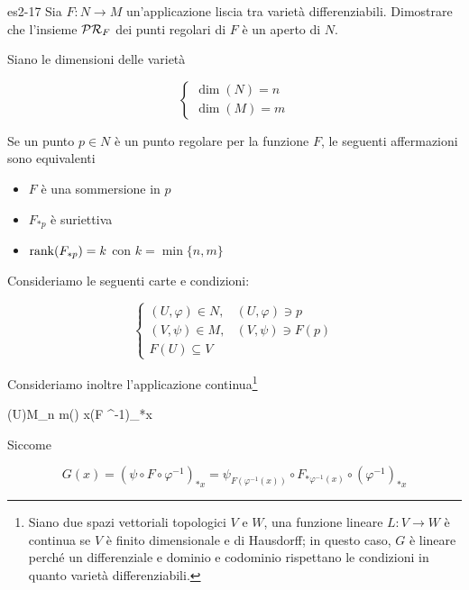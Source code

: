 {es2-17}
{
Sia $ F : N \to M $ un'applicazione liscia tra varietà differenziabili. Dimostrare che l'insieme $ \mathcal{PR}_{F} $ dei punti regolari di $ F $ è un aperto di $ N $.
}
{

Siano le dimensioni delle varietà

\begin{equation}
	\begin{cases}
		\dim(N) = n \\
		\dim(M) = m
	\end{cases}
\end{equation}

Se un punto $ p \in N $ è un punto regolare per la funzione $ F $, le seguenti affermazioni sono equivalenti

\begin{itemize}
	\item $ F $ è una sommersione in $ p $
	
	\item $ F_{*p} $ è suriettiva
	
	\item  $ \rank(F_{*p}) = k $ con $ k = \min \{n,m\} $
\end{itemize}

Consideriamo le seguenti carte e condizioni:

\begin{equation}
	\begin{cases}
		(U,\varphi) \in N, & (U,\varphi) \ni p \\
		(V,\psi) \in M, & (V,\psi) \ni F(p) \\
		F(U) \subseteq V
	\end{cases}
\end{equation}

Consideriamo inoltre l'applicazione continua\footnote{%
	Siano due spazi vettoriali topologici $ V $ e $ W $, una funzione lineare $ L : V \to W $ è continua se $ V $ è finito dimensionale e di Hausdorff; in questo caso, $ G $ è lineare perché un differenziale e dominio e codominio rispettano le condizioni in quanto varietà differenziabili.%
}

	{\varphi(U)}{M_{n \times m}(\R)}
	{x}{(\psi \circ F \circ \varphi^{-1})_{*x}}

Siccome

\begin{equation}
	G(x) = (\psi \circ F \circ \varphi^{-1})_{*x} %
	= \psi_{F(\varphi^{-1}(x))} \circ F_{*\varphi^{-1}(x)} \circ (\varphi^{-1})_{*x}
\end{equation}

}
